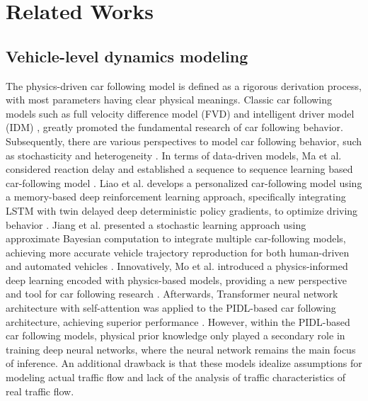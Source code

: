 \section{Related Works\label{2}
}
\subsection{Vehicle-level dynamics modeling}
The physics-driven car following model is defined as a rigorous derivation process, with most parameters having clear physical meanings. Classic car following models such as full velocity difference model (FVD) \citep{zhao2005new} and intelligent driver model (IDM) \citep{treiber2000congested}, greatly promoted the fundamental research of car following behavior. Subsequently, there are various perspectives to model car following behavior, such as stochasticity \citep{ngoduy2019langevin} and heterogeneity \citep{wang2022stability}. 
In terms of data-driven models, Ma et al. considered reaction delay and established a sequence to sequence learning based car-following model \citep{ma2020sequence}. Liao et al. develops a personalized car-following model using a memory-based deep reinforcement learning approach, specifically integrating LSTM with twin delayed deep deterministic policy gradients, to optimize driving behavior \citep{liao2024modelling}. Jiang et al. presented a stochastic learning approach using approximate Bayesian computation to integrate multiple car-following models, achieving more accurate vehicle trajectory reproduction for both human-driven and automated vehicles \citep{jiang2024generic}. 
Innovatively, Mo et al. introduced a physics-informed deep learning encoded with physics-based models, providing a new perspective and tool for car following research \citep{mo2021physics}. Afterwards, Transformer neural network architecture with self-attention was applied to the PIDL-based car following architecture, achieving superior performance \citep{geng2023physics}. However, within the PIDL-based car following models, physical prior knowledge only played a secondary role in training deep neural networks, where the neural network remains the main focus of inference. An additional drawback is that these models idealize assumptions for modeling actual traffic flow and lack of the analysis of traffic characteristics of real traffic flow.

